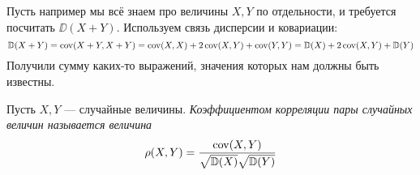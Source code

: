 \begin{comment}
    Мы доказали, что ковариация является может не самым простым, но всё же линейным объектом, с которыми мы работать
    умеем. Кроме того мы вывели связь непонятной для нас дисперсии, и довольно понятной ковариации: оказывается, что
    дисперсия является просто квадратичной формой, ассоциированной с ковариацией. Это позволяет нам считать дисперсию
    от неочевидных сочетаний случайных величин.
\end{comment}
\begin{example}
    Пусть например мы всё знаем про величины $X, Y$ по отдельности, и требуется посчитать $\DD(X + Y)$. Используем
    связь дисперсии и ковариации:
    \[
        \mathbb{D}(X + Y) = \operatorname{\mathop{\mathrm{cov}}}(X + Y, X + Y) = \operatorname{\mathop{\mathrm{cov}}}(X, X) + 2\operatorname{\mathop{\mathrm{cov}}}(X, Y) + \operatorname{\mathop{\mathrm{cov}}}(Y, Y) = \mathbb{D}(X) + 2\operatorname{\mathop{\mathrm{cov}}}(X, Y) + \mathbb{D}(Y)
    \]
    Получили сумму каких-то выражений, значения которых нам должны быть известны.
\end{example}
\begin{definition}
    Пусть $X, Y$ --- случайные величины. \it{Коэффициентом корреляции} пары случайных величин называется величина
    \[
        \rho(X, Y) = \frac{\operatorname{\mathop{\mathrm{cov}}}(X, Y)}{\sqrt{\mathbb{D}(X)}\sqrt{\mathbb{D}(Y)}}
    \]
\end{definition}

